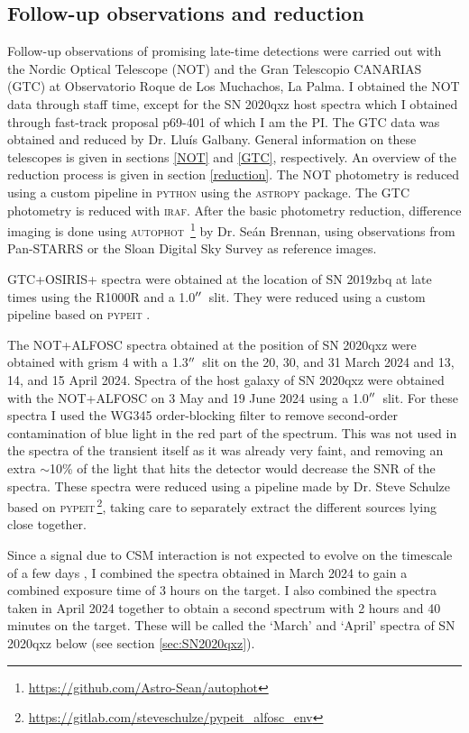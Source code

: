 \documentclass[a4paper,oneside,12pt, class=Latex/Classes/PhDthesisPSnPDF, crop=false]{standalone}
\begin{document}
\subsection{Follow-up observations and reduction}
\label{sec:reduction}
Follow-up observations of promising late-time detections were carried out with the Nordic Optical Telescope (NOT) and the Gran Telescopio CANARIAS (GTC) at Observatorio Roque de Los Muchachos, La Palma. I obtained the NOT data through staff time, except for the SN 2020qxz host spectra which I obtained through fast-track proposal p69-401 of which I am the PI. The GTC data was obtained and reduced by Dr. Lluís Galbany. General information on these telescopes is given in sections \ref{NOT} and \ref{GTC}, respectively. An overview of the reduction process is given in section \ref{reduction}. The NOT photometry is reduced using a custom pipeline in \textsc{python} using the \textsc{astropy} package. The GTC photometry is reduced with \textsc{iraf}. After the basic photometry reduction, difference imaging is done using \textsc{autophot} \cite{Autophot}\,\footnote{\url{https://github.com/Astro-Sean/autophot}} by Dr. Seán Brennan, using observations from Pan-STARRS \citep{Pan-STARRS1} or the Sloan Digital Sky Survey \citep[SDSS, ][]{SDSS-I-II, SDSS_DR4, SDSS_telescope} as reference images.

GTC+OSIRIS+ spectra were obtained at the location of SN 2019zbq at late times using the R1000R and a 1.0$^{\prime\prime}$\ slit. They were reduced using a custom pipeline based on \textsc{pypeit} \citep{pypeit:joss_pub, pypeit:zenodo}.

The NOT+ALFOSC spectra obtained at the position of SN 2020qxz were obtained with grism 4 with a 1.3$^{\prime\prime}$\ slit on the 20, 30, and 31 March 2024 and 13, 14, and 15 April 2024. Spectra of the host galaxy of SN 2020qxz were obtained with the NOT+ALFOSC on 3 May and 19 June 2024 using a 1.0$^{\prime\prime}$\ slit. For these spectra I used the WG345 order-blocking filter to remove second-order contamination of blue light in the red part of the spectrum. This was not used in the spectra of the transient itself as it was already very faint, and removing an extra $\sim$10\% of the light that hits the detector would decrease the SNR of the spectra. These spectra were reduced using a pipeline made by Dr. Steve Schulze based on \textsc{pypeit}\,\footnote{\url{https://gitlab.com/steveschulze/pypeit_alfosc_env}}, taking care to separately extract the different sources lying close together.

Since a signal due to CSM interaction is not expected to evolve on the timescale of a few days \citep[e.g.,][]{2015cp}, I combined the spectra obtained in March 2024 to gain a combined exposure time of 3 hours on the target. I also combined the spectra taken in April 2024 together to obtain a second spectrum with 2 hours and 40 minutes on the target. These will be called the `March' and `April' spectra of SN 2020qxz below (see section \ref{sec:SN2020qxz}).
\end{document}
